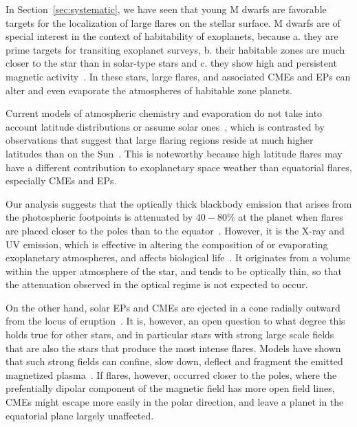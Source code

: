 \documentclass[proof]{WileyASNA-v1}
\newcommand{\jdag}[1]{\textcolor{darkred}{#1}}
\begin{document}
In Section~\ref{sec:systematic}, we have seen that young M dwarfs are favorable targets for the localization of large flares on the stellar surface. 
M dwarfs are of special interest in the context of habitability of exoplanets, because a. they are prime targets for transiting exoplanet surveys, b. their habitable zones are much closer to the star than in solar-type stars and c. they show high and persistent magnetic activity~\citep{shields2016}.
In these stars, large flares, and associated CMEs and EPs can alter and even evaporate the atmospheres of habitable zone planets.

Current models of atmospheric chemistry and evaporation do not take into account latitude distributions or assume solar ones~\citet{tilley2019, chen2021}, which is contrasted by observations that suggest that large flaring regions reside at much higher latitudes than on the Sun~\citep{wolter2008,ilin2021b}.
This is noteworthy because high latitude flares may have a different contribution to exoplanetary space weather than equatorial flares, especially CMEs and EPs.

Our analysis suggests that the optically thick blackbody emission that arises from the photospheric footpoints is attenuated by $40-80\%$ at the planet when flares are placed closer to the poles than to the equator~\citep[assuming the star-planet system is spin-orbit aligned,][]{ilin2021b}. However, it is the X-ray and UV emission, which is effective in altering the composition of or evaporating exoplanetary atmospheres, and affects biological life~\citep[see][and references therein]{airapetian2020}. It originates from a volume within the upper atmosphere of the star, and tends to be optically thin, so that the attenuation observed in the optical regime is not expected to occur.

On the other hand, solar EPs and CMEs are ejected in a cone radially outward from the locus of eruption~\citep{fisher1984,xie2004}. It is, however, an open question to what degree this holds true for other stars, and in particular stars with strong large scale fields that are also the stars that produce the most intense flares. %
Models have shown that such strong fields can confine, slow down, deflect and fragment the emitted magnetized plasma~\citep{alvaradogomez2018, alvaradogomez2019, kay2019}. If flares, however, occurred closer to the poles, where the prefentially dipolar component of the magnetic field has more open field lines, CMEs might escape more easily in the polar direction, and leave a planet in the equatorial plane largely unaffected. %
      
\end{document}
